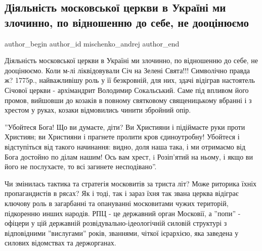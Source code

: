  
 
 
 
 
 
\subsection{Діяльність московської церкви в Україні ми злочинно, по відношенню до себе, не дооцінюємо}
\label{sec:31_07_2021.fb.mischenko_andrej.1.cerkov_upc_moskovia}
 
\ifcmt
 author_begin
   author_id mischenko_andrej
 author_end
\fi

Діяльність московської церкви в Україні ми злочинно, по відношенню до себе, не
дооцінюємо. Коли м-лі ліквідовували Січ на Зелені Свята!!! Символічно правда ж?
1775р., найважливішу роль у її безкровній, для них, здачі відіграв настоятель
Січової церкви - архімандрит Володимир Сокальський. Саме під впливом його
промов, вийшовши до козаків в повному святковому священицькому вбранні і з
хрестом у руках, козаки відмовились чинити збройний опір. 

''Убойтеся Бога! Що ви думаєте, діти? Ви Християни і підіймаєте руки проти
Християн; ви Християни і прагнете пролити кров єдиноутробну! Убойтеся і
відступіться від такого начинання: видно, доля наша така, і ми отримаємо від
Бога достойно по ділам нашим! Ось вам хрест, i Розіп'ятий на ньому, і якщо ви
його не послухаєте, то всі загинете несподівано''. 

Чи змінилась тактика та стратегія московитів за триста літ? Може риторика
їхніх пропагандистів в рясах? Як і тоді, так і зараз їхня так звана церква
відіграє ключову роль в загарбанні та опануванні московитами чужих територій,
підкоренню инших народів. РПЦ  - це державний орган Московії, а ''попи'' -
офіцери у цій державній розвідувально-ідеологічній силовій структурі з
відповідними ''вислугами'' років, званнями, чіткої ієрархією, яка заведена у
силових відомствах та держорганах. 

